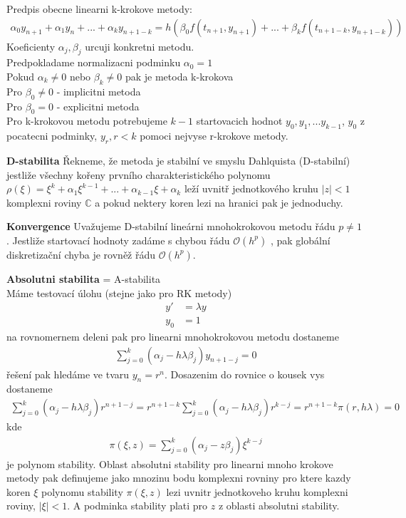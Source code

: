 \documentclass[a4]{report}
\theoremstyle{definition}
\begin{document}
{Predpis obecne linearni k-krokove metody:
\begin{align}
\alpha_{0} y_{n+1} + \alpha_{1} y_{n} + ... + \alpha_{k} y_{n+1-k} = h \left( \beta_{0} f(t_{n+1},y_{n+1})+ ... + \beta_{k}f(t_{n+1-k},y_{n+1-k}) \right)
\end{align}
Koeficienty $\alpha_{j}, \beta_{j}$ urcuji konkretni metodu. \\
Predpokladame normalizacni podminku $\alpha_{0}=1$ \\
Pokud $\alpha_{k} \neq0$ nebo $\beta_{k} \neq 0$ pak je metoda k-krokova \\
Pro $\beta_{0} \neq 0$ - implicitni metoda \\
Pro $\beta_{0}= 0 $ - explicitni metoda \\
Pro k-krokovou metodu potrebujeme $k-1$ startovacich hodnot $y_{0},y_{1},...y_{k-1}$, $y_{0}$ z pocatecni podminky, $y_{r}, r<k$ pomoci nejvyse r-krokove metody. 

\textbf{D-stabilita}
Řekneme, že metoda je stabilní ve smyslu Dahlquista (D-stabilní) jestliže všechny kořeny prvního charakteristického polynomu $\rho (\xi) = \xi^{k} + \alpha_{1} \xi^{k-1}+...+\alpha_{k-1} \xi+ \alpha_{k}$ leží uvnitř jednotkového kruhu $\vert z \vert < 1$ komplexni roviny $\mathbb{C}$ a pokud nektery koren lezi na hranici pak je jednoduchy. 

\textbf{Konvergence}
Uvažujeme D-stabilní lineárni mnohokrokovou metodu řádu $p \neq 1$ . Jestliže startovací hodnoty zadáme s chybou řádu $\mathcal{O}(h^{p})$ , pak globální diskretizační chyba je rovněž řádu $\mathcal{O}(h^{p}) $.

\textbf{Absolutni stabilita} = A-stabilita \\
Máme testovací úlohu (stejne jako pro RK metody)
\begin{align}
y'&=\lambda y \\
y_{0}&=1
\end{align}
na rovnomernem deleni pak pro linearni mnohokrokovou metodu dostaneme
\begin{align}
\sum_{j=0}^{k} (\alpha_{j} - h \lambda \beta_{j}) y_{n+1-j}=0
\end{align}
řešení pak hledáme ve tvaru $y_{n}=r^{n}$. Dosazenim do rovnice o kousek vys dostaneme
\begin{align}
\sum_{j=0}^{k}(\alpha_{j}-h \lambda \beta_{j})r^{n+1-j} = r^{n+1-k} \sum _{j=0}^{k} (\alpha_{j}-h \lambda \beta_{j}) r^{k-j}=r^{n+1-k} \pi (r,h\lambda) =0
\end{align}
kde 
\begin{align}
\pi(\xi,z) = \sum _{j=0}^{k}(\alpha_{j}-z \beta _{j}) \xi^{k-j}
\end{align}
je polynom stability. Oblast absolutni stability pro linearni mnoho krokove metody pak definujeme jako mnozinu bodu komplexni rovniny pro ktere kazdy koren $\xi$ polynomu stability $\pi(\xi, z)$ lezi uvnitr jednotkoveho kruhu komplexni roviny, $\vert \xi\vert<1$. A podminka stability plati pro $z$ z oblasti absolutni stability. 


}
\end{document}
